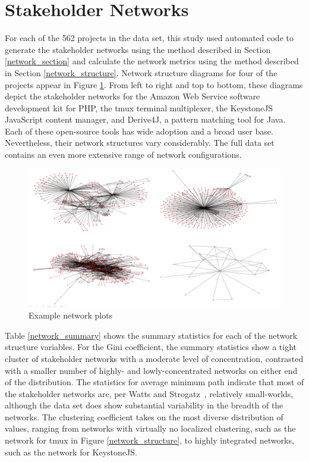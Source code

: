 \section{Stakeholder Networks}

For each of the 562 projects in the data set, this study used automated code to generate the stakeholder networks using the method described in Section \ref{network_section} and calculate the network metrics using the method described in Section \ref{network_structure}. Network structure diagrams for four of the projects appear in Figure \ref{network_plots}. From left to right and top to bottom, these diagrams depict the stakeholder networks for the Amazon Web Service software development kit for PHP, the tmux terminal multiplexer, the KeystoneJS JavaScript content manager, and Derive4J, a pattern matching tool for Java. Each of these open-source tools has wide adoption and a broad user base. Nevertheless, their network structures vary considerably. The full data set contains an even more extensive range of network configurations.

\begin{figure}
  \includegraphics[width=.95\textwidth]{img/network_plots.PNG}
\caption{Example network plots}
\label{network_plots}
\end{figure}

Table \ref{network_summary} shows the summary statistics for each of the network structure variables. For the Gini coefficient, the summary statistics show a tight cluster of stakeholder networks with a moderate level of concentration, contrasted with a smaller number of highly- and lowly-concentrated networks on either end of the distribution. The statistics for average minimum path indicate that most of the stakeholder networks are, per Watts and Strogatz~\cite{watts}, relatively small-worlds, although the data set does show substantial variability in the breadth of the networks. The clustering coefficient takes on the most diverse distribution of values, ranging from networks with virtually no localized clustering, such as the network for tmux in Figure \ref{network_structure}, to highly integrated networks, such as the network for KeystoneJS.

